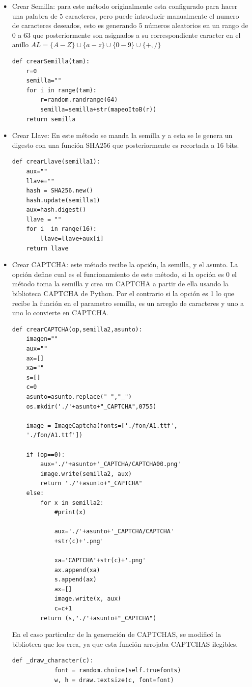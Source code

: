 \documentclass[12pt,oneside,onecolumn,openany]{report}
\begin{document}
\begin{itemize}
 \item Crear Semilla: para este método originalmente esta configurado para hacer una palabra de 5 caracteres, pero puede introducir manualmente el numero de caracteres deseados, esto es generando 5 números aleatorios en un rango de 0 a 63 que posteriormente son asignados a su correspondiente caracter en el anillo $AL=\{A-Z\}\cup \{a-z\}\cup \{0-9\}\cup \{+,/\}$ 
 \begin{lstlisting}[frame=single]
  def crearSemilla(tam):
	r=0
	semilla=""
	for i in range(tam):
		r=random.randrange(64)
		semilla=semilla+str(mapeoItoB(r))
	return semilla
 \end{lstlisting}
 \item Crear Llave: En este método se manda la semilla y a esta se le genera un digesto con una función SHA256 	que posteriormente es recortada a 16 bits.
 \begin{lstlisting}[frame=single]
  def crearLlave(semilla1):
	aux=""
	llave=""
	hash = SHA256.new()
	hash.update(semilla1)
	aux=hash.digest()
	llave = ""
	for i  in range(16):
		llave=llave+aux[i]
	return llave
 \end{lstlisting}
 \item Crear CAPTCHA: este método recibe la opción, la semilla, y el asunto. La opción define cual es el funcionamiento de este método, si la opción es 0 el método toma la semilla y crea un CAPTCHA a partir de ella usando la biblioteca CAPTCHA de Python. Por el contrario si la opción es 1 lo que recibe la función en el parametro semilla, es un arreglo de caracteres y uno a uno lo convierte en CAPTCHA.
 \begin{lstlisting}[frame=single]
  def crearCAPTCHA(op,semilla2,asunto):
	imagen=""
	aux=""
	ax=[]
	xa=""
	s=[]
	c=0
	asunto=asunto.replace(" ","_")
	os.mkdir('./'+asunto+"_CAPTCHA",0755)
	
	image = ImageCaptcha(fonts=['./fon/A1.ttf',
	'./fon/A1.ttf'])
	
	if (op==0):
		aux='./'+asunto+'_CAPTCHA/CAPTCHA00.png'
		image.write(semilla2, aux)
		return './'+asunto+"_CAPTCHA"
	else:
		for x in semilla2:
			#print(x)
			
			aux='./'+asunto+'_CAPTCHA/CAPTCHA'
			+str(c)+'.png'
			
			xa='CAPTCHA'+str(c)+'.png'
			ax.append(xa)
			s.append(ax)
			ax=[]
			image.write(x, aux)
			c=c+1
		return (s,'./'+asunto+"_CAPTCHA")
 \end{lstlisting}
 En el caso particular de la generación de CAPTCHAS, se modificó la biblioteca que los crea, ya que esta función arrojaba CAPTCHAS ilegibles.
 \begin{lstlisting}[frame=single]
  def _draw_character(c):
            font = random.choice(self.truefonts)
            w, h = draw.textsize(c, font=font)


\end{lstlisting}
\end{itemize}
\end{document}
